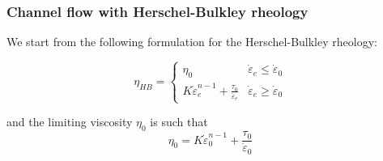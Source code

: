 \subsubsection{Channel flow with Herschel-Bulkley rheology \label{ss:HBflow}}

We start from the following formulation for the Herschel-Bulkley rheology:
\begin{mdframed}[backgroundcolor=blue!5]
\[
\eta_{HB}
=
\left\{
\begin{array}{lc}
\eta_0 & \dot{\varepsilon}_e\leq \dot{\varepsilon}_0 \\
K  \dot{\varepsilon}_e^{n-1} + \frac{\tau_0}{\dot{\varepsilon}_e}  
& \dot{\varepsilon}_e\geq \dot{\varepsilon}_0 
\end{array}
\right.
\]
\end{mdframed}
and the limiting viscosity $\eta_0$ is such that 
\[
\eta_0 = K  \dot{\varepsilon}_0^{n-1} + \frac{\tau_0}{\dot{\varepsilon}_0}  
\]

